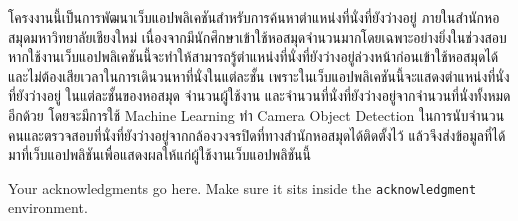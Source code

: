 \maketitle
\makesignature

\ifproject
\begin{abstractTH}
    โครงงานนี้เป็นการพัฒนาเว็บแอปพลิเคชันสำหรับการค้นหาตำแหน่งที่นั่งที่ยังว่างอยู่ 
    \enskip ภายในสำนักหอสมุดมหาวิทยาลัยเชียงใหม่ 
    เนื่องจากมีนักศึกษาเข้าใช้หอสมุดจำนวนมากโดยเฉพาะอย่างยิ่งในช่วงสอบ 
    หากใช้งานเว็บแอปพลิเคชันนี้จะทำให้สามารถรู้ตำแหน่งที่นั่งที่ยังว่างอยู่ล่วงหน้าก่อนเข้าใช้หอสมุดได้ 
    และไม่ต้องเสียเวลาในการเดินวนหาที่นั่งในแต่ละชั้น เพราะในเว็บแอปพลิเคชันนี้จะแสดงตำแหน่งที่นั่งที่ยังว่างอยู่
    \enskip ในแต่ละชั้นของหอสมุด จำนวนผู้ใช้งาน และจำนวนที่นั่งที่ยังว่างอยู่จากจำนวนที่นั่งทั้งหมดอีกด้วย 
    โดยจะมีการใช้ Machine Learning ทำ Camera Object Detection 
    ในการนับจำนวนคนและตรวจสอบที่นั่งที่ยังว่างอยู่จากกล้องวงจรปิดที่ทางสำนักหอสมุดได้ติดตั้งไว้ 
    แล้วจึงส่งข้อมูลที่ได้มาที่เว็บแอปพลิชันเพื่อแสดงผลให้แก่ผู้ใช้งานเว็บแอปพลิชันนี้    
\end{abstractTH}

\iffalse
\begin{dedication}
This document is dedicated to all Chiang Mai University students.

Dedication page is optional.
\end{dedication}
\fi %

\begin{acknowledgments}
Your acknowledgments go here. Make sure it sits inside the
\texttt{acknowledgment} environment.

\end{acknowledgments}%
\fi %

\contentspage

\ifproject
\figurelistpage

\tablelistpage
\fi %



